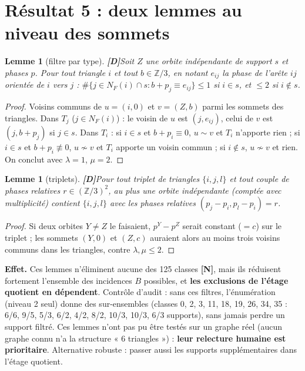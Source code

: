 \documentclass[11pt,a4paper]{article}
\newtheorem{lemma}[theorem]{Lemme}
\theoremstyle{remark}
\newcommand{\Z}{\mathbb{Z}}
\newcommand{\st}[1]{\textbf{[#1]}}
\begin{document}
\section{Résultat 5 : deux lemmes au niveau des sommets}\label{sec:l25}
\begin{lemma}[filtre par type] \st{D}\label{lem:type}
Soit $Z$ une orbite indépendante de support $s$ et phases $p$. Pour tout triangle $i$ et tout $b\in\Z/3$, en notant $e_{ij}$ la phase de l'arête $ij$ orientée
de $i$ vers $j$ :
$\#\{j\in N_F(i)\cap s : b+p_j\equiv e_{ij}\}\le 1$ si $i\in s$, et $\le2$ si $i\notin s$.
\end{lemma}
\begin{proof}
Voisins communs de $u=(i,0)$ et $v=(Z,b)$ parmi les sommets des triangles. Dans $T_j$ ($j\in N_F(i)$) : le voisin de $u$ est $(j,e_{ij})$, celui de $v$ est
$(j,b+p_j)$ si $j\in s$. Dans $T_i$ : si $i\in s$ et $b+p_i\equiv0$, $u\sim v$ et $T_i$ n'apporte rien ; si $i\in s$ et $b+p_i\not\equiv0$, $u\not\sim v$
et $T_i$ apporte un voisin commun ; si $i\notin s$, $u\not\sim v$ et rien. On conclut avec $\lambda=1$, $\mu=2$.
\end{proof}
\begin{lemma}[triplets] \st{D}\label{lem:triple}
Pour tout triplet de triangles $\{i,j,l\}$ et tout couple de phases relatives $r\in(\Z/3)^2$, au plus \emph{une} orbite indépendante (comptée avec
multiplicité) contient $\{i,j,l\}$ avec les phases relatives $(p_j-p_i,p_l-p_i)=r$.
\end{lemma}
\begin{proof}
Si deux orbites $Y\neq Z$ le faisaient, $p^Y-p^Z$ serait constant ($=c$) sur le triplet ; les sommets $(Y,0)$ et $(Z,c)$ auraient alors au moins trois voisins
communs dans les triangles, contre $\lambda,\mu\le2$.
\end{proof}
\textbf{Effet.} Ces lemmes n'éliminent aucune des 125 classes \st{N}, mais ils réduisent fortement l'ensemble des incidences $B$ possibles, et
\textbf{les exclusions de l'étage quotient en dépendent}. Contrôle d'audit : sans ces filtres, l'énumération (niveau 2 seul) donne des sur-ensembles
(classes 0, 2, 3, 11, 18, 19, 26, 34, 35 : 6/6, 9/5, 5/3, 6/2, 4/2, 8/2, 10/3, 10/3, 6/3 supports), sans jamais perdre un support filtré.
Ces lemmes n'ont pas pu être testés sur un graphe réel (aucun graphe connu n'a la structure « 6 triangles ») : \textbf{leur relecture humaine est prioritaire}.
Alternative robuste : passer aussi les supports supplémentaires dans l'étage quotient.

\end{document}
